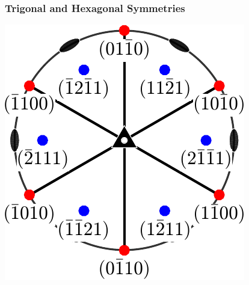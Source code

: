 \documentclass[compress]{beamer}
\begin{document}
\begin{frame}[fragile]
  \frametitle{Trigonal and Hexagonal Symmetries}

  \vspace{-.3cm}

  \begin{center}
    \begin{minipage}[t]{0.3\linewidth}
       \vspace{0pt}
      \includegraphics[width=\textwidth]{pic/hkl}
    \end{minipage}
    \hfill
    \begin{minipage}[t]{0.3\linewidth}
       \vspace{0pt}

\end{minipage}
\end{center}
\end{frame}
\end{document}
